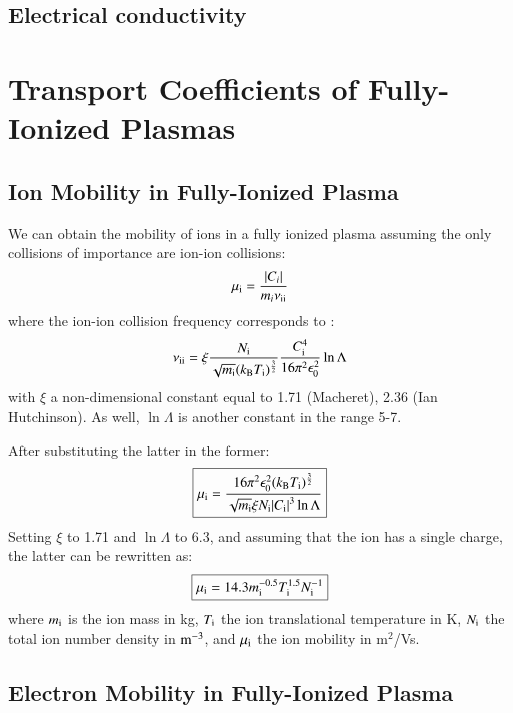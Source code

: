 \documentclass{warpdoc}
\newcommand{\mfd}{\displaystyle}
\newcommand\frameeqn[1]{\fbox{$\displaystyle #1$}}
\begin{document}
%

\subsection{Electrical conductivity}

\section{Transport Coefficients of Fully-Ionized Plasmas}



\subsection{Ion Mobility in Fully-Ionized Plasma}

We can obtain the mobility of ions in a fully ionized plasma assuming the only collisions of importance are ion-ion collisions:
%
\begin{equation}
 \mu_{\rm i} = \frac{|C_i|}{m_i \nu_{\rm ii}}
\end{equation}
% 
where the ion-ion collision frequency corresponds to \cite{book:1984:chen}:
%
\begin{equation}
\nu_{\rm ii}=\xi \frac{ N_{\rm i}}{ \sqrt{m_{\rm i}} (k_{\rm B} T_{\rm i})^\frac{3}{2}}  \frac{C_{\rm i}^4}{16 \pi^2 \epsilon_0^2}  \ln \Lambda
\end{equation}
%
with $\xi$ a non-dimensional constant equal to 1.71 (Macheret), 2.36 (Ian Hutchinson). As well, $\ln \Lambda$ is another constant in the range 5-7.


After substituting the latter in the former:
%
\begin{equation}
\frameeqn{
 \mu_{\rm i} = \frac{16 \pi^2 \epsilon_0^2 (k_{\rm B} T_{\rm i})^\frac{3}{2}}{\mfd \sqrt{m_{\rm i}} \xi  N_{\rm i}  |C_{\rm i}|^3  \ln \Lambda}
}
\end{equation}
% 
Setting $\xi$ to 1.71 and $\ln \Lambda$ to 6.3, and assuming that the ion has a single charge, the latter can be rewritten as:
%
\begin{equation}
\frameeqn{
 \mu_{\rm i} = 14.3 m_{\rm i}^{-0.5} T_{\rm i}^{1.5} N_{\rm i}^{-1}
}
\end{equation}
% 
where $m_{\rm i}$ is the ion mass in kg, $T_{\rm i}$ the ion translational temperature in K, $N_{\rm i}$ the total ion number density in $\rm m^{-3}$, and $\mu_{\rm i}$ the ion mobility in m$^2$/Vs.


\subsection{Electron Mobility in Fully-Ionized Plasma}
\end{document}
